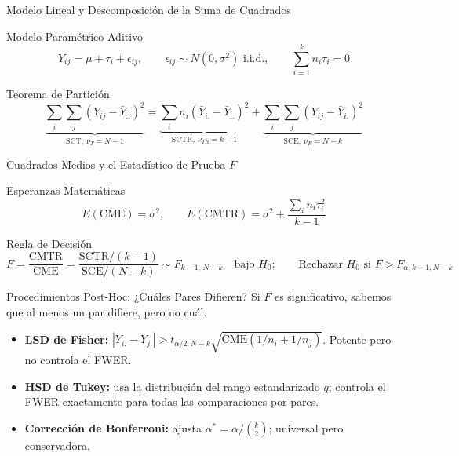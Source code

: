 \documentclass[10pt, aspectratio=169]{beamer}
\begin{document}
\begin{frame}{Modelo Lineal y Descomposición de la Suma de Cuadrados}
  \footnotesize
  \begin{block}{Modelo Paramétrico Aditivo}
    $$Y_{ij} = \mu + \tau_i + \epsilon_{ij}, \qquad \epsilon_{ij}\sim N(0,\sigma^2) \text{ i.i.d.}, \qquad \sum_{i=1}^k n_i\tau_i = 0$$
  \end{block}
  \pause

  \vspace{0.1cm}
  \begin{alertblock}{Teorema de Partición}
    $$\underbrace{\sum_i\sum_j (Y_{ij}-\bar Y_{..})^2}_{\text{SCT},\ \nu_T=N-1} = \underbrace{\sum_i n_i(\bar Y_{i.}-\bar Y_{..})^2}_{\text{SCTR},\ \nu_{TR}=k-1} + \underbrace{\sum_i\sum_j (Y_{ij}-\bar Y_{i.})^2}_{\text{SCE},\ \nu_E=N-k}$$
  \end{alertblock}
\end{frame}

\begin{frame}{Cuadrados Medios y el Estadístico de Prueba $F$}
  \footnotesize
  \begin{block}{Esperanzas Matemáticas}
    $$E(\text{CME})=\sigma^2, \qquad E(\text{CMTR}) = \sigma^2 + \frac{\sum_i n_i\tau_i^2}{k-1}$$
  \end{block}
  \pause

  \vspace{0.1cm}
  \begin{alertblock}{Regla de Decisión}
    $$F = \frac{\text{CMTR}}{\text{CME}} = \frac{\text{SCTR}/(k-1)}{\text{SCE}/(N-k)} \sim F_{k-1,\,N-k} \quad\text{bajo } H_0; \qquad \text{Rechazar } H_0 \text{ si } F>F_{\alpha,k-1,N-k}$$
  \end{alertblock}
\end{frame}

\begin{frame}{Procedimientos Post-Hoc: ¿Cuáles Pares Difieren?}
  \footnotesize
  Si $F$ es significativo, sabemos que al menos un par difiere, pero no cuál. \pause
  \begin{itemize}\itemsep=0.1cm
    \item \textbf{LSD de Fisher:} $|\bar Y_{i.}-\bar Y_{j.}| > t_{\alpha/2,N-k}\sqrt{\text{CME}(1/n_i+1/n_j)}$. Potente pero no controla el FWER. \pause
    \item \textbf{HSD de Tukey:} usa la distribución del rango estandarizado $q$; controla el FWER exactamente para todas las comparaciones por pares. \pause
    \item \textbf{Corrección de Bonferroni:} ajusta $\alpha^* = \alpha/\binom{k}{2}$; universal pero conservadora.
  \end{itemize}
\end{frame}
\end{document}
